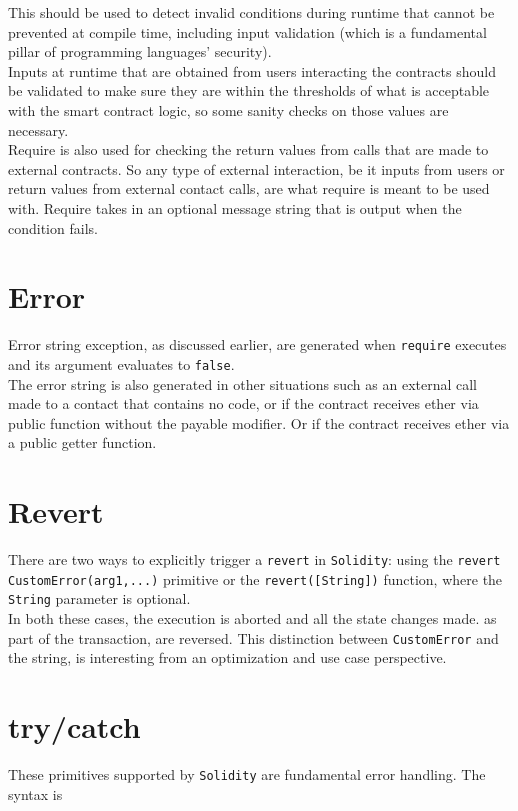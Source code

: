 This should be used to detect invalid conditions during runtime that cannot be prevented at compile time, including input validation (which is a fundamental pillar of programming languages' security).\\ 

Inputs at runtime that are obtained from users interacting the contracts should be validated to make sure they are within the thresholds of what is acceptable with the smart contract logic, so some sanity checks on those values are necessary.\\

Require is also used for checking the return values from calls that are made to external contracts. So any type of external interaction, be it inputs from users or return values from external contact calls, are what require is meant to be used with. Require takes in an optional message string that is output when the condition fails.

\section{Error}
Error string exception, as discussed earlier, are generated when \texttt{require} executes and its argument evaluates to \texttt{false}.\\ 

The error string is also generated in other situations such as an external call made to a contact that contains no code, or if the contract receives ether via public function without the payable modifier. Or if the contract receives ether via a public getter function.

\section{Revert}
There are two ways to explicitly trigger a \texttt{revert} in \texttt{Solidity}: using the \texttt{revert CustomError(arg1,...)} primitive or the \texttt{revert([String])} function, where the \texttt{String} parameter is optional.\\

In both these cases, the execution is aborted and all the state changes made. as part of the transaction, are reversed. This distinction between \texttt{CustomError} and the string, is interesting from an optimization and use case perspective.

\section{try/catch}
These primitives supported by \texttt{Solidity} are fundamental error handling. The syntax is

